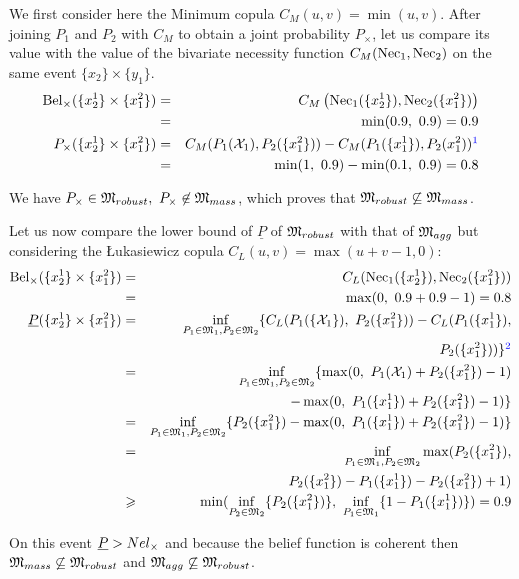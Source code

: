 \begin{example}
    
    We first consider here the Minimum copula $C_M(u,v)=\min(u,v)$. After joining $P_1$ and $P_2$ with $C_M$ to obtain a joint probability $P_\times$, let us compare its value with the value of the bivariate necessity function $C_M({\mathrm{Nec}}_1, {\mathrm{Nec}}_2)$ on the same event $\{x_2\}\times\{y_1\}$.
    \begin{eqnarray*}
        \Bel_\times(\{x^1_2\}\times\{x^2_1\}) &=& C_M\left(\Nec_1(\{x^1_2\}), \Nec_2(\{x^2_1\})\right)\\
        &=& \min(0.9,~0.9) = 0.9\\
        P_\times(\{x^1_2\}\times\{x^2_1\}) &=& C_M(P_1(\X_1), P_2(\{x^2_1\})) - C_M(P_1(\{x^1_1\}),P_2(x^2_1))\commanue{je vois pas de quelle précédente formule sort le calcul}\\
        &=& \min(1,~0.9) - \min(0.1,~0.9) = 0.8
    \end{eqnarray*}
    
    We have $P_\times\in{\mathfrak{M}}_{robust}, ~P_\times\not\in{\mathfrak{M}}_{mass}$, which proves that ${\mathfrak{M}}_{robust}\not\subseteq{\mathfrak{M}}_{mass}$.
    
    Let us now compare the lower bound of $\underline{P}$ of ${\mathfrak{M}}_{robust}$ with that of ${\mathfrak{M}}_{agg}$ but considering the \L ukasiewicz copula $C_L(u,v)=\max(u+v-1,0)$:
    \begin{eqnarray*}
        \Bel_\times(\{x^1_2\}\times\{x^2_1\}) &=& C_L(\Nec_1(\{x^1_2\}), \Nec_2(\{x^2_1\}))\\
        &=& \max(0,~0.9 + 0.9 - 1) = 0.8\\
        \low(\{x^1_2\}\times\{x^2_1\}) &=& \inf_{P_1\in\M_1, P_2\in\M_2}\{C_L(P_1(\{\X_1\}),~P_2(\{x^2_1\})) - C_L(P_1(\{x^1_1\}),\\
        && P_2(\{x^2_1\}))\}\commanue{une petite aide pour retrouver la formule utilisée}\\
        &=& \inf_{P_1\in\M_1, P_2\in\M_2}\{\max(0,~P_1(\X_1) + P_2(\{x^2_1\}) - 1)\\
        && - \max(0,~P_1(\{x^1_1\}) + P_2(\{x^2_1\}) -1)\}\\
        &=& \inf_{P_1\in\M_1, P_2\in\M_2}\{P_2(\{x^2_1\}) - \max(0,~P_1(\{x^1_1\}) + P_2(\{x^2_1\}) - 1 )\}\\
        &=& \inf_{P_1\in\M_1, P_2\in\M_2}\max(P_2(\{x^2_1\}),\\
        && P_2(\{x^2_1\})-P_1(\{x^1_1\}) - P_2(\{x^2_1\}) + 1 )\\
        &\geqslant& \min(\inf_{P_2\in\M_2}\{P_2(\{x^2_1\})\},~\inf_{P_1\in\M_1}\{1-P_1(\{x^1_1\})\}) = 0.9
    \end{eqnarray*}
    
    On this event ${\underline{P}}>Nel_\times$ and because the belief function is coherent then ${\mathfrak{M}}_{mass}\not\subseteq{\mathfrak{M}}_{robust}$ and ${\mathfrak{M}}_{agg}\not\subseteq{\mathfrak{M}}_{robust}$.
\end{example}

